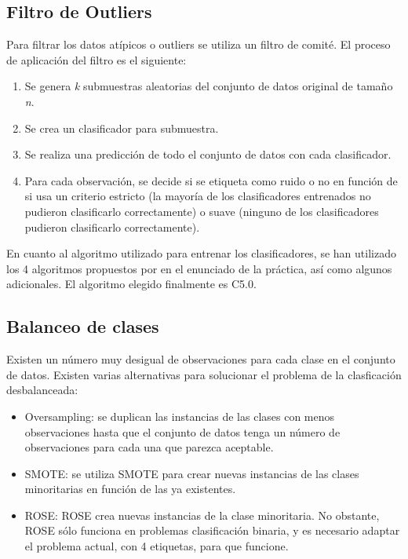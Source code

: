 \documentclass[]{scrartcl}
\begin{document}
\subsection{Filtro de Outliers}

Para filtrar los datos atípicos o outliers se utiliza un filtro de comité. El proceso de aplicación del filtro es el siguiente:

\begin{enumerate}
	\item Se genera \emph{k} submuestras aleatorias del conjunto de datos original de tamaño \emph{n}.
	\item Se crea un clasificador para submuestra.
	\item Se realiza una predicción de todo el conjunto de datos con cada clasificador.
	\item Para cada observación, se decide si se etiqueta como ruido o no en función de si usa un criterio estricto (la mayoría de los clasificadores entrenados no pudieron clasificarlo correctamente) o suave (ninguno de los clasificadores pudieron clasificarlo correctamente). 
\end{enumerate}

En cuanto al algoritmo utilizado para entrenar los clasificadores, se han utilizado los 4 algoritmos propuestos por en el enunciado de la práctica, así como algunos adicionales. El algoritmo elegido finalmente es C5.0.

\subsection{Balanceo de clases}
Existen un número muy desigual de observaciones para cada clase en el conjunto de datos. Existen varias alternativas para solucionar el problema de la clasficación desbalanceada:

\begin{itemize}
	\item Oversampling: se duplican las instancias de las clases con menos observaciones hasta que el conjunto de datos tenga un número de observaciones para cada una que parezca aceptable.
	\item SMOTE: se utiliza SMOTE para crear nuevas instancias de las clases minoritarias en función de las ya existentes.
	\item ROSE: ROSE crea nuevas instancias de la clase minoritaria. No obstante, ROSE sólo funciona en problemas clasificación binaria, y es necesario adaptar el problema actual, con 4 etiquetas, para que funcione.
\end{itemize}
\end{document}
